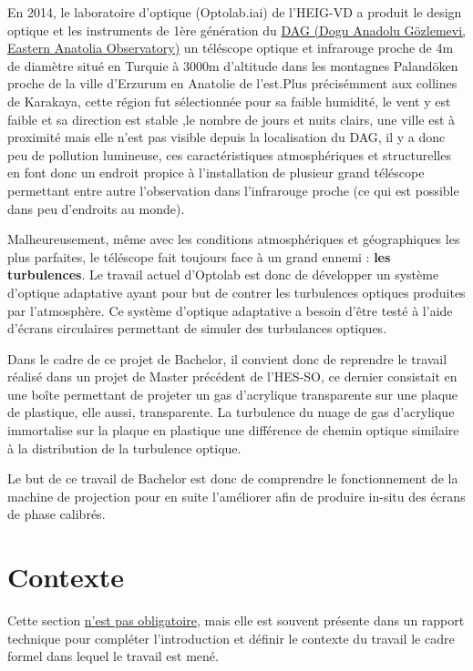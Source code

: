 
En 2014, le laboratoire d'optique (Optolab.iai) de l'HEIG-VD a produit le design optique et les instruments de 1ère génération du \href{https://atasam.atauni.edu.tr/}{DAG (Dogu Anadolu Gözlemevi, Eastern Anatolia Observatory)}\footnotemark
un téléscope optique et infrarouge proche de 4m de diamètre situé en Turquie à 3000m d'altitude dans les montagnes Palandöken proche de la ville d'Erzurum en Anatolie de l'est.Plus précisémment aux collines de Karakaya, cette région fut sélectionnée pour sa faible humidité, le vent y est faible et sa direction est stable
,le nombre de jours et nuits clairs, une ville est à proximité mais elle n'est pas visible depuis la localisation du DAG, il y a donc peu de pollution lumineuse, ces caractéristiques atmosphériques et structurelles en font donc un endroit propice à l'installation de plusieur grand téléscope permettant entre autre l'observation
dans l'infrarouge proche (ce qui est possible dans peu d'endroits au monde).

Malheureusement, même avec les conditions atmosphériques et géographiques les plus parfaites, le téléscope fait toujours face à un grand ennemi : \textbf{les turbulences}.
Le travail actuel d'Optolab est donc de développer un système d'optique adaptative ayant pour but de contrer les turbulences optiques produites par l'atmosphère. Ce système
d'optique adaptative a besoin d'être testé à l'aide d'écrans circulaires permettant de simuler des turbulances optiques.

Dans le cadre de ce projet de Bachelor, il convient donc de reprendre le travail réalisé dans un projet de Master précédent de l'HES-SO, ce dernier consistait en une boîte permettant de projeter un gas d'acrylique transparente sur une plaque de plastique, elle aussi, transparente. La turbulence du nuage de gas
d'acrylique immortalise sur la plaque en plastique une différence de chemin optique similaire à la distribution de la turbulence optique.

Le but de ce travail de Bachelor est donc de comprendre le fonctionnement de la machine de projection pour en suite l'améliorer afin de produire in-situ des écrans de phase calibrés.

\newpage


\section{Contexte}
Cette section \underline{n'est pas obligatoire}, mais elle est souvent présente dans un rapport technique pour compléter l'introduction et définir le contexte du travail \cad le cadre formel dans lequel le travail est mené.


